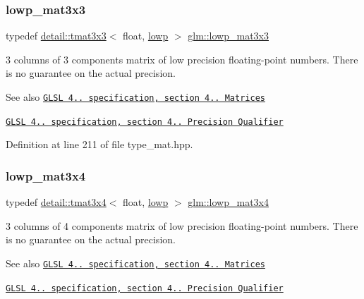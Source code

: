 \subsubsection{\texorpdfstring{lowp\+\_\+mat3x3}{lowp\_mat3x3}}
{\footnotesize\ttfamily typedef \hyperlink{structglm_1_1detail_1_1tmat3x3}{detail\+::tmat3x3}$<$ float, \hyperlink{namespaceglm_a0f04f086094c747d227af4425893f545ae161af3fc695e696ce3bf69f7332bc2d}{lowp} $>$ \hyperlink{group__core__precision_ga31688b397d10806ead332c3adb7dc0f0}{glm\+::lowp\+\_\+mat3x3}}

3 columns of 3 components matrix of low precision floating-\/point numbers. There is no guarantee on the actual precision.

\begin{DoxySeeAlso}{See also}
\href{http://www.opengl.org/registry/doc/GLSLangSpec.4.20.8.pdf}{\tt G\+L\+SL 4.. specification, section 4.. Matrices} 

\href{http://www.opengl.org/registry/doc/GLSLangSpec.4.20.8.pdf}{\tt G\+L\+SL 4.. specification, section 4.. Precision Qualifier} 
\end{DoxySeeAlso}


Definition at line 211 of file type\+\_\+mat.\+hpp.

\mbox{\label{group__core__precision_ga9cea06e7378fe59abf95c1f56edc4320}} 
\subsubsection{\texorpdfstring{lowp\+\_\+mat3x4}{lowp\_mat3x4}}
{\footnotesize\ttfamily typedef \hyperlink{structglm_1_1detail_1_1tmat3x4}{detail\+::tmat3x4}$<$ float, \hyperlink{namespaceglm_a0f04f086094c747d227af4425893f545ae161af3fc695e696ce3bf69f7332bc2d}{lowp} $>$ \hyperlink{group__core__precision_ga9cea06e7378fe59abf95c1f56edc4320}{glm\+::lowp\+\_\+mat3x4}}

3 columns of 4 components matrix of low precision floating-\/point numbers. There is no guarantee on the actual precision.

\begin{DoxySeeAlso}{See also}
\href{http://www.opengl.org/registry/doc/GLSLangSpec.4.20.8.pdf}{\tt G\+L\+SL 4.. specification, section 4.. Matrices} 

\href{http://www.opengl.org/registry/doc/GLSLangSpec.4.20.8.pdf}{\tt G\+L\+SL 4.. specification, section 4.. Precision Qualifier} 
\end{DoxySeeAlso}


